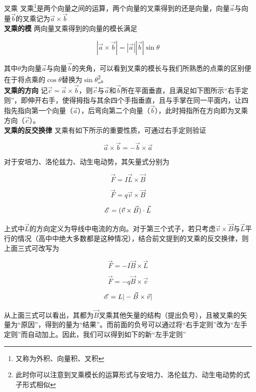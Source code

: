 \begin{defi}{叉乘}{}
叉乘\footnote{又称为外积、向量积、叉积}是两个向量之间的运算，两个向量的叉乘得到的还是向量，向量$\vec{a}$与向量$\vec{b}$的叉乘记为$\vec{a} \times \vec{b}$
~\\

\textbf{叉乘的模}  \quad 两向量叉乘得到的向量的模长满足

$$ | \vec{a} \times \vec{b} | = | \vec{a} | | \vec{b} | \sin \theta$$

其中$\theta$为向量$\vec{a}$与向量$\vec{b}$的夹角，可以看到叉乘的模长与我们所熟悉的点乘的区别便在于将点乘的$\cos \theta$替换为$\sin \theta$\footnote{此时你可以注意到叉乘模长的运算形式与安培力、洛伦兹力、动生电动势的式子形式相似}。
~\\

\textbf{叉乘的方向} \quad 记$\vec{c} = \vec{a} \times \vec{b}$，则$\vec{c}$与$\vec{a}$和$\vec{b}$所在平面垂直，且满足如下图所示“右手定则”，即伸开右手，使得拇指与其余四个手指垂直，且与手掌在同一平面内，让四指先指向第一个向量（$\vec{a}$），后弯向第二个向量（$\vec{b}$），此时拇指所在方向即为叉乘方向（$\vec{c}$）。
~\\

\textbf{叉乘的反交换律}
叉乘有如下所示的重要性质，可通过右手定则验证

$$\vec{a} \times \vec{b} = - \vec{b} \times \vec{a}$$

\end{defi}

对于安培力、洛伦兹力、动生电动势，其矢量式分别为

$$\vec{F} = I \vec{L} \times \vec{B}$$

$$\vec{F} = q \vec{v} \times \vec{B}$$

$$\mathscr{E} = (\vec{v} \times \vec{B}) \cdot \vec{L}$$

上式中$\vec{L}$的方向定义为导线中电流的方向。对于第三个式子，若只考虑$\vec{v} \times \vec{B}$与$\vec{L}$平行的情况（高中中绝大多数都是这种情况），结合前文提到的叉乘的反交换律，则上面三式可改写为

$$\vec{F} = - I \vec{B} \times \vec{L}$$

$$\vec{F} = - q \vec{B} \times \vec{v}$$

$$\mathscr{E} = L | - \vec{B} \times \vec{v} |$$

从上面三式可以看出，其都为$\vec{B}$叉乘其他矢量的结构（提出负号），且被叉乘的矢量为“原因”，得到的量为“结果”。而前面的负号可以通过将“右手定则”改为“左手定则”而自动加上。因此，我们可以得到如下的新“左手定则”

